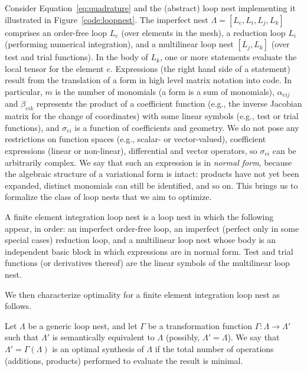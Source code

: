 Consider Equation~\ref{eq:quadrature} and the (abstract) loop nest implementing it illustrated in Figure~\ref{code:loopnest}. The imperfect nest $\Lambda=[L_e, L_i, L_j, L_k]$ comprises an order-free loop $L_e$ (over elements in the mesh), a reduction loop $L_i$ (performing numerical integration), and a multilinear loop nest $[L_j, L_k]$ (over test and trial functions). In the body of $L_k$, one or more statements evaluate the local tensor for the element $e$. Expressions (the right hand side of a statement) result from the translation of a form in high level matrix notation into code. In particular, $m$ is the number of monomials (a form is a sum of monomials), $\alpha_{eij}$ and $\beta_{eik}$ represents the product of a coefficient function (e.g., the inverse Jacobian matrix for the change of coordinates) with some linear symbols (e.g., test or trial functions), and $\sigma_{ei}$ is a function of coefficients and geometry. We do not pose any restrictions on function spaces (e.g., scalar- or vector-valued), coefficient expressions (linear or non-linear), differential and vector operators, so $\sigma_{ei}$ can be arbitrarily complex. We say that such an expression is in \textit{normal form}, because the algebraic structure of a variational form is intact: products have not yet been expanded, distinct monomials can still be identified, and so on. This brings us to formalize the class of loop nests that we aim to optimize.


\begin{Def}
\label{def:fem-loopnest}
A finite element integration loop nest is a loop nest in which the following appear, in order: an imperfect order-free loop, an imperfect (perfect only in some special cases) reduction loop, and a multilinear loop nest whose body is an independent basic block in which expressions are in normal form. Test and trial functions (or derivatives thereof) are the linear symbols of the multilinear loop nest.
\end{Def}

We then characterize optimality for a finite element integration loop nest as follows.

\begin{Def}
\label{def:mln-optimality}
Let $\Lambda$ be a generic loop nest, and let $\Gamma$ be a transformation function $\Gamma : \Lambda \rightarrow \Lambda'$ such that $\Lambda'$ is semantically equivalent to $\Lambda$ (possibly, $\Lambda' = \Lambda$). We say that $\Lambda' = \Gamma (\Lambda)$ is an optimal synthesis of $\Lambda$ if the total number of operations (additions, products) performed to evaluate the result is minimal.
\end{Def}

